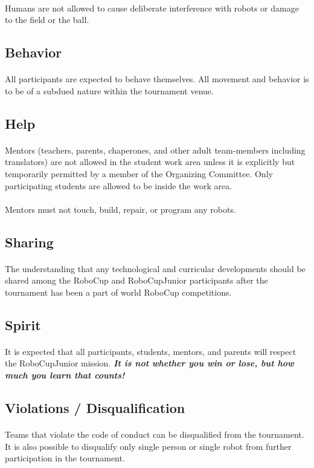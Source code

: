 \documentclass{article}
\newcommand*{\p}{\paragraph{}}
\begin{document}
\p Humans are not allowed to cause deliberate interference with robots or damage
to the field or the ball.

\subsection{ Behavior \label{ref-042}}

\p All participants are expected to behave themselves. All movement and behavior
is to be of a subdued nature within the tournament venue.

\subsection{ Help \label{ref-043}}

\p Mentors (teachers, parents, chaperones, and other adult team-members including
translators) are not allowed in the student work area unless it is explicitly
but temporarily permitted by a member of the Organizing Committee. Only
participating students are allowed to be inside the work area.

\p Mentors must not touch, build, repair, or program any robots.

\subsection{ Sharing \label{ref-044}}

\p The understanding that any technological and curricular developments should be
shared among the RoboCup and RoboCupJunior participants after the tournament
has been a part of world RoboCup competitions.

\subsection{ Spirit \label{ref-045}}

\p It is expected that all participants, students, mentors, and parents will
respect the RoboCupJunior mission. \textbf{\textit{It is not whether you win or
lose, but how much you learn that counts!}}

\subsection{ Violations / Disqualification \label{ref-046}}

\p Teams that violate the code of conduct can be disqualified from the tournament.
It is also possible to disqualify only single person or single robot from
further participation in the tournament.
\end{document}
